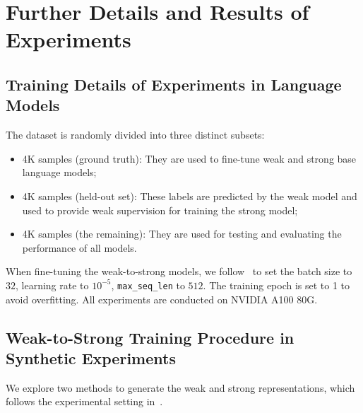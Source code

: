 \section{Further Details and Results of Experiments}

\subsection{Training Details of Experiments in Language Models} \label{exp_llm_training_detail}

The dataset is randomly divided into three distinct subsets:
\begin{itemize}
    \item 4K samples (ground truth): They are used to fine-tune weak and strong base language models;
    \item 4K samples (held-out set): These labels are predicted by the weak model and used to provide weak supervision for training the strong model;
    \item 4K samples (the remaining): They are used for testing and evaluating the performance of all models.
\end{itemize}

When fine-tuning the weak-to-strong models, we follow~\citep{yang2024super} to set the batch size to $32$, learning rate to $10^{-5}$, \texttt{max\_seq\_len} to $512$.
The training epoch is set to 1 to avoid overfitting. All experiments are conducted on NVIDIA A100 80G.

\subsection{Weak-to-Strong Training Procedure in Synthetic Experiments} \label{appendix:syn_train}

We explore two methods to generate the weak and strong representations, which follows the experimental setting in~\citep{charikar2024quantifying}.


